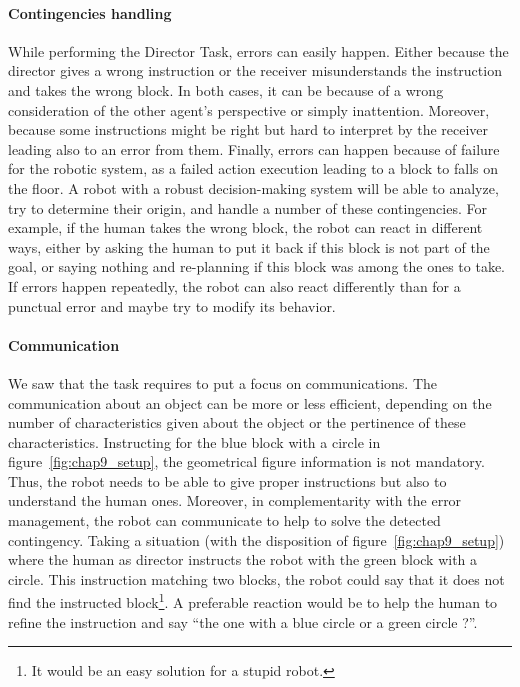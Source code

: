 \paragraph{Contingencies handling} While performing the Director Task, errors can easily happen. Either because the director gives a wrong instruction or the receiver misunderstands the instruction and takes the wrong block. In both cases, it can be because of a wrong consideration of the other agent's perspective or simply inattention. Moreover, because some instructions might be right but hard to interpret by the receiver leading also to an error from them. Finally, errors can happen because of failure for the robotic system, as a failed action execution leading to a block to falls on the floor. A robot with a robust decision-making system will be able to analyze, try to determine their origin, and handle a number of these contingencies. For example, if the human takes the wrong block, the robot can react in different ways, either by asking the human to put it back if this block is not part of the goal, or saying nothing and re-planning if this block was among the ones to take. If errors happen repeatedly, the robot can also react differently than for a punctual error and maybe try to modify its behavior.

\paragraph{Communication} We saw that the task requires to put a focus on communications. The communication about an object can be more or less efficient, depending on the number of characteristics given about the object or the pertinence of these characteristics. Instructing for the blue block with a circle in figure~\ref{fig:chap9_setup}, the geometrical figure information is not mandatory. Thus, the robot needs to be able to give proper instructions but also to understand the human ones. Moreover, in complementarity with the error management, the robot can communicate to help to solve the detected contingency. Taking a situation (with the disposition of figure~\ref{fig:chap9_setup}) where the human as director instructs the robot with the green block with a circle. This instruction matching two blocks, the robot could say that it does not find the instructed block\footnote{It would be an easy solution for a stupid robot.}. A preferable reaction would be to help the human to refine the instruction and say ``the one with a blue circle or a green circle ?''.

